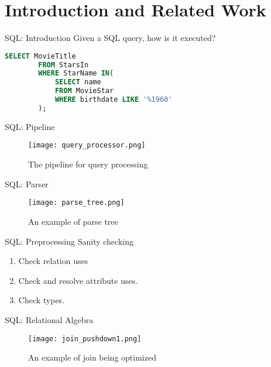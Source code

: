 \section{Introduction and Related Work}
\frame{\sectionpage}


\begin{frame}[fragile]{SQL: Introduction}
    Given a SQL query, how is it executed?
    \begin{lstlisting}[language=SQL, caption= SQL query to execute.]
        SELECT MovieTitle
        FROM StarsIn
        WHERE StarName IN(
            SELECT name
            FROM MovieStar
            WHERE birthdate LIKE '%1960'
        );
    \end{lstlisting}
\end{frame}

\begin{frame}{SQL: Pipeline}
    \begin{figure}
        \centering
        \texttt{[image: query\_processor.png]}\\
        \caption{The pipeline for query processing}
        \label{fig:query_processor}
    \end{figure}
\end{frame}

\begin{frame}{SQL: Parser}
    \begin{figure}
        \centering
        \texttt{[image: parse\_tree.png]}\\
        \caption{An example of parse tree}
        \label{fig:prase_tree}
    \end{figure}
\end{frame}

\begin{frame}{SQL: Preprocessing}
    Sanity checking
    \begin{enumerate}
        \item Check relation uses
        \item Check and resolve attribute uses.
        \item Check types.
    \end{enumerate}
\end{frame}

\begin{frame}{SQL: Relational Algebra}
    \begin{figure}
        \centering
        \texttt{[image: join\_pushdown1.png]}\\
        \caption{An example of join being optimized}
        \label{fig:j_1}
    \end{figure}
\end{frame}

